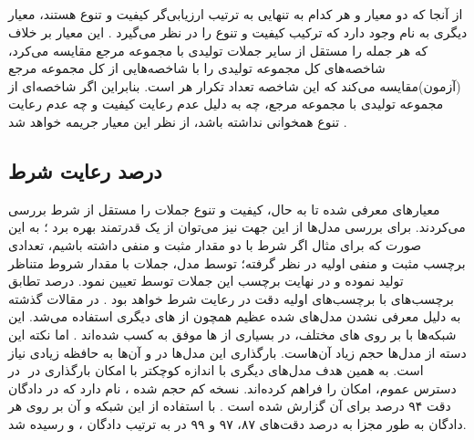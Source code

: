 \subsection{\jaccard{}}
از آنجا که دو معیار \bleu{} و \selfbleu{} هر کدام به تنهایی به ترتیب ارزیابی‌گر کیفیت و تنوع هستند، معیار دیگری به نام \jaccard{} وجود دارد که ترکیب کیفیت و تنوع را در نظر می‌گیرد \cite{jointly}. این معیار بر خلاف \bleu{} که هر جمله را مستقل از سایر جملات تولیدی با مجموعه مرجع مقایسه می‌کرد، شاخصه‌های کل مجموعه تولیدی را با شاخصه‌هایی از کل مجموعه مرجع (آزمون)‌مقایسه می‌کند که این شاخصه تعداد تکرار هر \ngramphrase{} است. بنابراین اگر شاخصه‌ای از مجموعه تولیدی با مجموعه مرجع، چه به دلیل عدم رعایت کیفیت و چه عدم رعایت تنوع همخوانی نداشته باشد، از نظر این معیار جریمه خواهد شد \cite{jointly}.
\subsection{درصد رعایت شرط}
معیارهای معرفی شده تا به حال، کیفیت و تنوع جملات را مستقل از شرط بررسی می‌کردند. برای بررسی مدل‌ها از این جهت نیز می‌توان از یک \classifier{} قدرتمند بهره برد
\cite{toward, sentigan}؛
به این صورت که برای مثال اگر شرط با دو مقدار مثبت و منفی داشته باشیم، تعدادی برچسب مثبت و منفی اولیه در نظر گرفته؛ توسط مدل، جملات با مقدار شروط متناظر تولید نموده و در نهایت برچسب این جملات توسط \classifier{} تعیین نمود. درصد تطابق برچسب‌های \classifier{} با برچسب‌های اولیه دقت در رعایت شرط خواهد بود
\cite{toward, sentigan}.
در مقالات گذشته به دلیل معرفی نشدن مدل‌های \pretrain{} شده عظیم همچون  از \classifier{}های دیگری استفاده می‌شد. این شبکه‌ها با
بر روی \task{}‌های مختلف، در بسیاری از \task{}ها موفق به کسب \stateoftheart{} شده‌اند \cite{bert}. اما نکته این دسته از مدل‌ها حجم زیاد آن‌هاست. بارگذاری  این مدل‌ها در \gpu{} و \finetuning{} آن‌ها به حافظه زیادی نیاز است. به همین هدف مدل‌های دیگری با اندازه کوچکتر با امکان بارگذاری در \gpu{}‌ در دسترس عموم، امکان \finetuning{} را فراهم کرده‌اند. نسخه کم حجم شده ،
نام دارد که در دادگان  دقت ۹۴ درصد برای آن گزارش شده است \cite{distilbert}. با استفاده از این شبکه و \finetuning{} آن بر روی هر دادگان به طور مجزا به درصد دقت‌های ۸۷، ۹۷ و ۹۹ در به ترتیب دادگان \sst{}، \yelp{} و \amazon{} رسیده شد.

